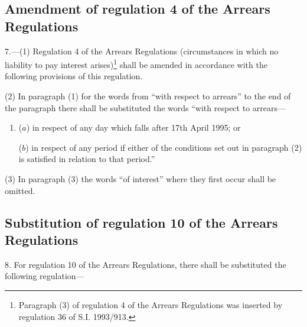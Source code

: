 \documentclass[a4paper]{article}
\begin{document}
\subsection[7. Amendment of regulation 4 of the Arrears Regulations]{Amendment of regulation 4 of the Arrears Regulations}

7.—(1) Regulation 4 of the Arrears Regulations (circumstances in which no liability to pay interest arises)\footnote{\frenchspacing Paragraph (3) of regulation 4 of the Arrears Regulations was inserted by regulation 36 of S.I. 1993/913.} shall be amended in accordance with the following provisions of this regulation.

(2) In paragraph (1) for the words from “with respect to arrears” to the end of the paragraph there shall be substituted the words “with respect to arrears—
\begin{enumerate}\item[]
($a$) in respect of any day which falls after 17th April 1995; or

($b$) in respect of any period if either of the conditions set out in paragraph (2) is satisfied in relation to that period.”
\end{enumerate}

(3) In paragraph (3) the words “of interest” where they first occur shall be omitted.

\subsection[8. Substitution of regulation 10 of the Arrears Regulations]{Substitution of regulation 10 of the Arrears Regulations}

8.  For regulation 10 of the Arrears Regulations, there shall be substituted the following regulation—
\end{document}
